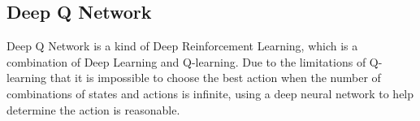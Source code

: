 \documentclass{article}
\begin{document}
    
    
    
    
    
    \subsection{Deep Q Network}
    Deep Q Network is a kind of Deep Reinforcement Learning, which is a combination of Deep Learning and Q-learning. Due to the limitations of Q-learning that it is impossible to choose the best action when the number of combinations of states and actions is infinite, using a deep neural network to help determine the action is reasonable. 
    
\end{document}
